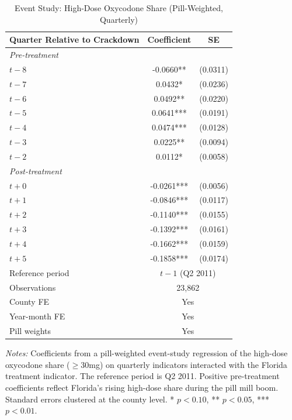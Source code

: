 \begin{table}[H]
\centering
\caption{Event Study: High-Dose Oxycodone Share (Pill-Weighted, Quarterly)}
\label{tab:eventstudy}
\begin{threeparttable}
\begin{tabular}{lcc}
\toprule
Quarter Relative to Crackdown & Coefficient & SE \\
\midrule
\textit{Pre-treatment} & & \\
$t-8$ & -0.0660** & (0.0311) \\
$t-7$ & 0.0432* & (0.0236) \\
$t-6$ & 0.0492** & (0.0220) \\
$t-5$ & 0.0641*** & (0.0191) \\
$t-4$ & 0.0474*** & (0.0128) \\
$t-3$ & 0.0225** & (0.0094) \\
$t-2$ & 0.0112* & (0.0058) \\
\midrule
\textit{Post-treatment} & & \\
$t+0$ & -0.0261*** & (0.0056) \\
$t+1$ & -0.0846*** & (0.0117) \\
$t+2$ & -0.1140*** & (0.0155) \\
$t+3$ & -0.1392*** & (0.0161) \\
$t+4$ & -0.1662*** & (0.0159) \\
$t+5$ & -0.1858*** & (0.0174) \\
\midrule
Reference period & \multicolumn{2}{c}{$t-1$ (Q2 2011)} \\
Observations & \multicolumn{2}{c}{23,862} \\
County FE & \multicolumn{2}{c}{Yes} \\
Year-month FE & \multicolumn{2}{c}{Yes} \\
Pill weights & \multicolumn{2}{c}{Yes} \\
\bottomrule
\end{tabular}
\begin{tablenotes}[flushleft]
\small
\item \textit{Notes:} Coefficients from a pill-weighted event-study regression of the high-dose oxycodone share ($\geq$30mg) on quarterly indicators interacted with the Florida treatment indicator. The reference period is Q2 2011. Positive pre-treatment coefficients reflect Florida's rising high-dose share during the pill mill boom. Standard errors clustered at the county level. * $p<0.10$, ** $p<0.05$, *** $p<0.01$.
\end{tablenotes}
\end{threeparttable}
\end{table}
